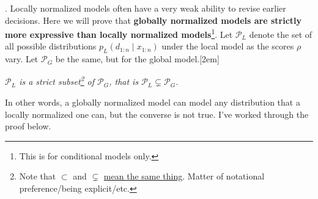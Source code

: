 \documentclass[11pt]{article}
\newcommand\myspace[1][]{\vspace{#1\bigskipamount}}
\newcommand\p{\Needspace{10\baselineskip} \noindent}
\begin{document}
\myspace
\p {}. Locally normalized models often have a very weak ability to revise earlier decisions. Here we will prove that \textbf{globally normalized models are strictly more expressive than locally normalized models}\footnote{This is for conditional models only.}. Let $\mathcal{P}_L$ denote the set of all possible distributions $p_L(d_{1:n} \mid x_{1:n})$ under the local model as the scores $\rho$ vary. Let $\mathcal{P}_G$ be the same, but for the global model.[2em]
\begin{center}
	 {\itshape $\mathcal{P}_L$ is a strict subset\footnote{Note that $\subset$ and $\subsetneq$ \href{https://math.stackexchange.com/questions/1191715}{mean the same thing}. Matter of notational preference/being explicit/etc.} of $\mathcal{P}_G$, that is $\mathcal{P}_L \subsetneq \mathcal{P}_G$. }
\end{center}
In other words, a globally normalized model can model any distribution that a locally normalized one can, but the converse is not true. I've worked through the proof below.
\end{document}
